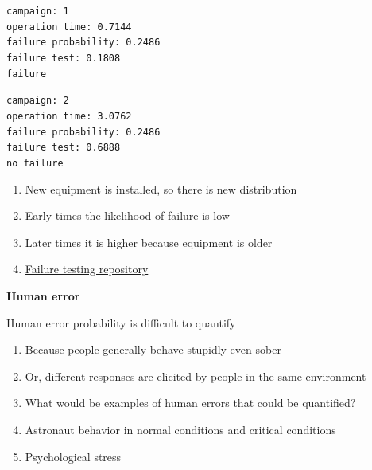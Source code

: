 \documentclass[aspectratio=1610,pdftex,dvipsnames,compress,xcolor={dvipsnames}]{beamer}
\begin{document}
\begin{frame}{}
    \texttt{campaign: 1\\
    operation time: 0.7144\\
    failure probability: 0.2486\\  
    failure test: 0.1808\\  
    failure}
    
    \vspace{0.10in}

    \texttt{campaign: 2\\
    operation time: 3.0762\\
    failure probability: 0.2486\\
    failure test: 0.6888\\
    no failure}

    \begin{enumerate}[series=outerlist,topsep=0pt,itemsep=5pt,leftmargin=*,label=(\arabic*)]
        \item[]New equipment is installed, so there is new distribution
        \item[]Early times the likelihood of failure is low 
        \item[]Later times it is higher because equipment is older
        \item[]\href{https://github.com/TheDoctorRAB/failure.testing}{Failure testing repository}
    \end{enumerate}
\end{frame}


\begin{frame}[plain]{}
    \centering\LARGE\textbf{Human error}
\end{frame}


\addtocounter{framenumber}{-1}
\begin{frame}{Human error probability is difficult to quantify}
    \begin{enumerate}[series=outerlist,topsep=0pt,itemsep=21pt,leftmargin=*,label=(\arabic*)]
        \item[]Because people generally behave stupidly even sober
        \item[]Or, different responses are elicited by people in the same environment
        \item[]What would be examples of human errors that could be quantified?
        \item[]Astronaut behavior in normal conditions and critical conditions
        \item[]Psychological stress
    \end{enumerate}
\end{frame}
\end{document}

